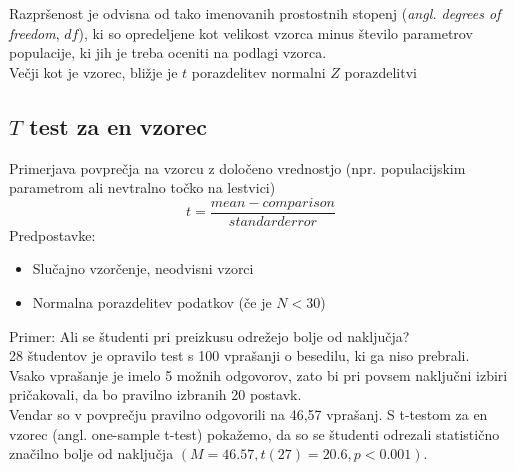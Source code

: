 Razpršenost je odvisna od tako imenovanih prostostnih stopenj (\textit{angl. degrees of freedom}, $df$), ki so opredeljene kot velikost vzorca minus število parametrov populacije, ki jih je treba oceniti na podlagi vzorca.\\
Večji kot je vzorec, bližje je $t$ porazdelitev normalni $Z$ porazdelitvi

\subsection*{$T$ test za en vzorec}

Primerjava povprečja na vzorcu z določeno vrednostjo (npr. populacijskim parametrom ali nevtralno točko na lestvici)\\
\[t = \frac{mean-comparison}{standard error}\]
Predpostavke:
\begin{itemize}
\item Slučajno vzorčenje, neodvisni vzorci
\item Normalna porazdelitev podatkov (če je $N < 30$)
\end{itemize}

Primer: Ali se študenti pri preizkusu odrežejo bolje od naključja?\\
28 študentov je opravilo test s 100 vprašanji o besedilu, ki ga niso prebrali.\\
Vsako vprašanje je imelo 5 možnih odgovorov, zato bi pri povsem naključni izbiri pričakovali, da bo pravilno izbranih 20 postavk.\\
Vendar so v povprečju pravilno odgovorili na 46,57 vprašanj. S t-testom za en vzorec (angl. one-sample t-test) pokažemo, da so se študenti odrezali statistično značilno bolje od naključja $(M=46.57, t(27)=20.6, p < 0.001)$.

